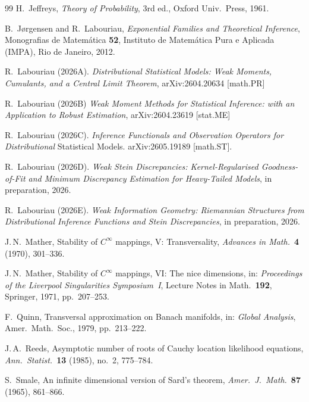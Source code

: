 \documentclass[11pt,a4paper]{article}
\begin{document}
\begin{thebibliography}{99}
H.~Jeffreys,
\emph{Theory of Probability}, 3rd ed., Oxford Univ.\ Press, 1961.

B.~J{\o}rgensen and R.~Labouriau,
\emph{Exponential Families and Theoretical Inference},
Monografias de Matem\'atica \textbf{52},
Instituto de Matem\'atica Pura e Aplicada (IMPA), Rio de Janeiro,
2012.

R.~Labouriau (2026A).
\emph{Distributional Statistical Models: Weak Moments, Cumulants, and a Central Limit Theorem},
arXiv:2604.20634 [math.PR]

R.~Labouriau (2026B)
\emph{Weak Moment Methods for Statistical Inference: with an Application to Robust Estimation},
arXiv:2604.23619 [stat.ME]

R.~Labouriau (2026C).
\emph{Inference  Functionals and Observation Operators for Distributional}
Statistical Models.
arXiv:2605.19189 [math.ST].

R.~Labouriau (2026D).
\emph{Weak Stein Discrepancies: Kernel-Regularised Goodness-of-Fit and
Minimum Discrepancy Estimation for Heavy-Tailed Models},
in preparation, 2026.

R.~Labouriau (2026E).
\emph{Weak Information Geometry:
Riemannian Structures from Distributional Inference Functions and Stein Discrepancies},
in preparation, 2026.


J.\,N.~Mather,
Stability of $C^\infty$ mappings, V: Transversality,
\emph{Advances in Math.}\ \textbf{4} (1970), 301--336.

J.\,N.~Mather,
Stability of $C^\infty$ mappings, VI: The nice dimensions,
in: \emph{Proceedings of the Liverpool Singularities Symposium~I},
Lecture Notes in Math.\ \textbf{192}, Springer, 1971, pp.~207--253.

F.~Quinn,
Transversal approximation on Banach manifolds,
in: \emph{Global Analysis}, Amer.\ Math.\ Soc., 1979, pp.~213--222.

J.\,A.~Reeds,
Asymptotic number of roots of Cauchy location likelihood equations,
\emph{Ann.\ Statist.}\ \textbf{13} (1985), no.~2, 775--784.

S.~Smale,
An infinite dimensional version of Sard's theorem,
\emph{Amer.\ J.\ Math.}\ \textbf{87} (1965), 861--866.


\end{thebibliography}
\end{document}
